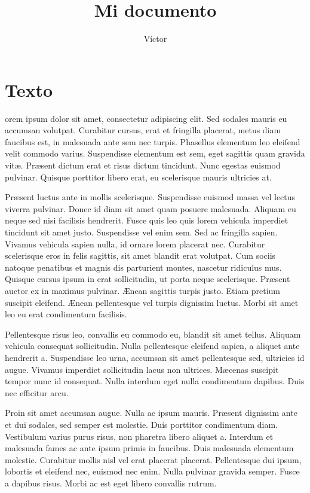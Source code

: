 \documentclass{article}
\title{Mi documento}
\author{Víctor}
\begin{document}
\maketitle{}
\newpage{}

\tableofcontents
\newpage{}

\section{Texto}

orem ipsum dolor sit amet, consectetur adipiscing elit. Sed sodales mauris eu accumsan volutpat. Curabitur cursus, erat et fringilla placerat, metus diam faucibus est, in malesuada ante sem nec turpis. Phasellus elementum leo eleifend velit commodo varius. Suspendisse elementum est sem, eget sagittis quam gravida vit\ae{}. Pr\ae{}sent dictum erat et risus dictum tincidunt. Nunc egestas euismod pulvinar. Quisque porttitor libero erat, eu scelerisque mauris ultricies at.

Pr\ae{}sent luctus ante in mollis scelerisque. Suspendisse euismod massa vel lectus viverra pulvinar. Donec id diam sit amet quam posuere malesuada. Aliquam eu neque sed nisi facilisis hendrerit. Fusce quis leo quis lorem vehicula imperdiet tincidunt sit amet justo. Suspendisse vel enim sem. Sed ac fringilla sapien. Vivamus vehicula sapien nulla, id ornare lorem placerat nec. Curabitur scelerisque eros in felis sagittis, sit amet blandit erat volutpat. Cum sociis natoque penatibus et magnis dis parturient montes, nascetur ridiculus mus. Quisque cursus ipsum in erat sollicitudin, ut porta neque scelerisque. Pr\ae{}sent auctor ex in maximus pulvinar. \AE{}nean sagittis turpis justo. Etiam pretium suscipit eleifend. \AE{}nean pellentesque vel turpis dignissim luctus. Morbi sit amet leo eu erat condimentum facilisis.

Pellentesque risus leo, convallis eu commodo eu, blandit sit amet tellus. Aliquam vehicula consequat sollicitudin. Nulla pellentesque eleifend sapien, a aliquet ante hendrerit a. Suspendisse leo urna, accumsan sit amet pellentesque sed, ultricies id augue. Vivamus imperdiet sollicitudin lacus non ultrices. M\ae{}cenas suscipit tempor nunc id consequat. Nulla interdum eget nulla condimentum dapibus. Duis nec efficitur arcu.

Proin sit amet accumsan augue. Nulla ac ipsum mauris. Pr\ae{}sent dignissim ante et dui sodales, sed semper est molestie. Duis porttitor condimentum diam. Vestibulum varius purus risus, non pharetra libero aliquet a. Interdum et malesuada fames ac ante ipsum primis in faucibus. Duis malesuada elementum molestie. Curabitur mollis nisl vel erat placerat placerat. Pellentesque dui ipsum, lobortis et eleifend nec, euismod nec enim. Nulla pulvinar gravida semper. Fusce a dapibus risus. Morbi ac est eget libero convallis rutrum.
\end{document}
